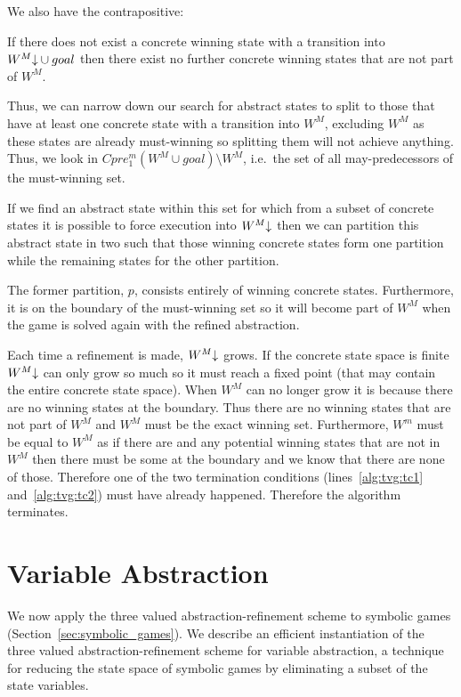 We also have the contrapositive:

\begin{thm}
If there does not exist a concrete winning state with a transition into $W^M\mathord{\downarrow} \cup goal$ then there exist no further concrete winning states that are not part of $W^M$. 
\end{thm}

Thus, we can narrow down our search for abstract states to split to those that have at least one concrete state with a transition into $W^M$, excluding $W^M$ as these states are already must-winning so splitting them will not achieve anything. Thus, we look in $Cpre_1^m(W^M \cup goal)\setminus W^M$, i.e.\ the set of all may-predecessors of the must-winning set. 

If we find an abstract state within this set for which from a subset of concrete states it is possible to force execution into $W^M\mathord{\downarrow}$ then we can partition this abstract state in two such that those winning concrete states form one partition while the remaining states for the other partition.

The former partition, $p$, consists entirely of winning concrete states. Furthermore, it is on the boundary of the must-winning set so it will become part of $W^M$ when the game is solved again with the refined abstraction.

Each time a refinement is made, $W^M\mathord{\downarrow}$ grows. If the concrete state space is finite $W^M\mathord{\downarrow}$ can only grow so much so it must reach a fixed point (that may contain the entire concrete state space). When $W^M$ can no longer grow it is because there are no winning states at the boundary. Thus there are no winning states that are not part of $W^M$ and $W^M$ must be the exact winning set. Furthermore, $W^m$ must be equal to $W^M$ as if there are and any potential winning states that are not in $W^M$ then there must be some at the boundary and we know that there are none of those. Therefore one of the two termination conditions (lines~\ref{alg:tvg:tc1} and~\ref{alg:tvg:tc2}) must have already happened. Therefore the algorithm terminates.

\section{Variable Abstraction}
\label{sec:variable_abstraction}

We now apply the three valued abstraction-refinement scheme to symbolic games (Section~\ref{sec:symbolic_games}). We describe an efficient instantiation of the three valued abstraction-refinement scheme for variable abstraction, a technique for reducing the state space of symbolic games by eliminating a subset of the state variables.

